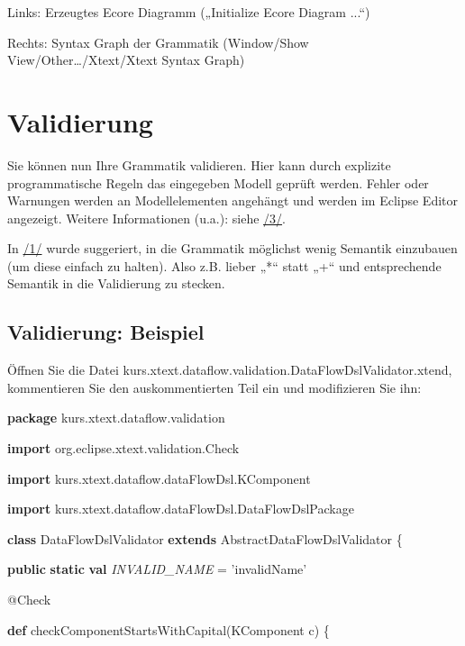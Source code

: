 \documentclass[a4]{article}
\begin{document}
Links: Erzeugtes Ecore Diagramm („Initialize Ecore Diagram ...``)

Rechts: Syntax Graph der Grammatik (Window/Show
View/Other\ldots{}/Xtext/Xtext Syntax Graph)

\section[Validierung]{\texorpdfstring{\protect\hypertarget{anchor-28}{}{}\protect\hypertarget{anchor-29}{}{}Validierung}{Validierung}}\label{validierung}

Sie können nun Ihre Grammatik validieren. Hier kann durch explizite
programmatische Regeln das eingegeben Modell geprüft werden. Fehler oder
Warnungen werden an Modellelementen angehängt und werden im Eclipse
Editor angezeigt. Weitere Informationen (u.a.): siehe
\protect\hyperlink{anchor-3}{/3/}.

In \protect\hyperlink{anchor-1}{/1/} wurde suggeriert, in die Grammatik
möglichst wenig Semantik einzubauen (um diese einfach zu halten). Also
z.B. lieber „*`` statt „+`` und entsprechende Semantik in die
Validierung zu stecken.

\subsection[Validierung:
Beispiel]{\texorpdfstring{\protect\hypertarget{anchor-30}{}{}\protect\hypertarget{anchor-31}{}{}Validierung:
Beispiel}{Validierung: Beispiel}}\label{validierung-beispiel}

Öffnen Sie die Datei
kurs.xtext.dataflow.validation.DataFlowDslValidator.xtend, kommentieren
Sie den auskommentierten Teil ein und modifizieren Sie ihn:

\textbf{package}
kurs.xtext.dataflow.validation

\textbf{import} org.eclipse.xtext.validation.Check

\textbf{import} kurs.xtext.dataflow.dataFlowDsl.KComponent

\textbf{import} kurs.xtext.dataflow.dataFlowDsl.DataFlowDslPackage

\textbf{class} DataFlowDslValidator \textbf{extends}
AbstractDataFlowDslValidator \{

\textbf{public} \textbf{static} \textbf{val} \emph{INVALID\_NAME} =
'invalidName'

@Check

\textbf{def} checkComponentStartsWithCapital(KComponent c) \{
\end{document}
